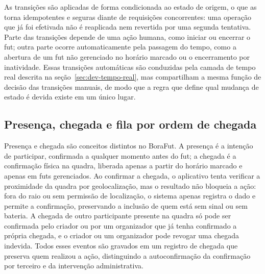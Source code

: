       As transições são aplicadas de forma condicionada ao estado de origem, o que as torna idempotentes e seguras diante de requisições concorrentes: uma operação que já foi efetivada não é reaplicada nem revertida por uma segunda tentativa. Parte das transições depende de uma ação humana, como iniciar ou encerrar o fut; outra parte ocorre automaticamente pela passagem do tempo, como a abertura de um fut não gerenciado no horário marcado ou o encerramento por inatividade. Essas transições automáticas são conduzidas pela camada de tempo real descrita na seção~\ref{sec:dev-tempo-real}, mas compartilham a mesma função de decisão das transições manuais, de modo que a regra que define qual mudança de estado é devida existe em um único lugar.

    \subsection{Presença, chegada e fila por ordem de chegada}
      \label{subsec:dev-fila}
      Presença e chegada são conceitos distintos no BoraFut. A presença é a intenção de participar, confirmada a qualquer momento antes do fut; a chegada é a confirmação física na quadra, liberada apenas a partir do horário marcado e apenas em futs gerenciados. Ao confirmar a chegada, o aplicativo tenta verificar a proximidade da quadra por geolocalização, mas o resultado não bloqueia a ação: fora do raio ou sem permissão de localização, o sistema apenas registra o dado e permite a confirmação, preservando a inclusão de quem está sem sinal ou sem bateria. A chegada de outro participante presente na quadra só pode ser confirmada pelo criador ou por um organizador que já tenha confirmado a própria chegada, e o criador ou um organizador pode revogar uma chegada indevida. Todos esses eventos são gravados em um registro de chegada que preserva quem realizou a ação, distinguindo a autoconfirmação da confirmação por terceiro e da intervenção administrativa.

